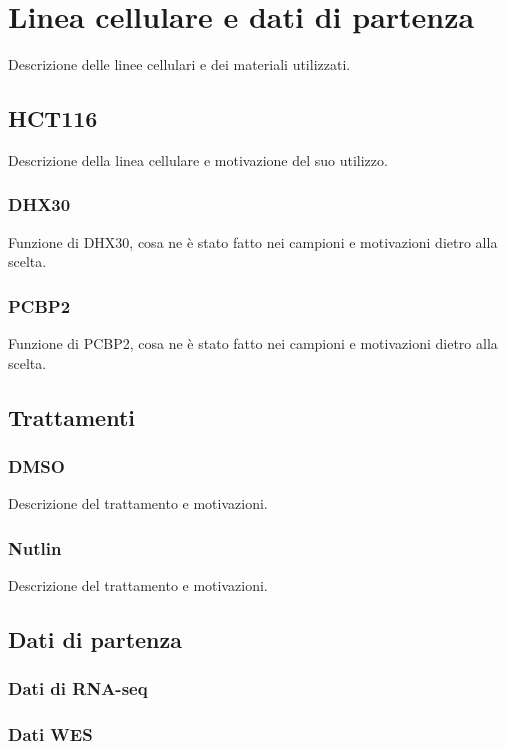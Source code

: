 \chapter{Linea cellulare e dati di partenza}
\label{cha:cell_lines}
Descrizione delle linee cellulari e dei materiali utilizzati.

\section{HCT116}
\label{sec:hct116}
Descrizione della linea cellulare e motivazione del suo utilizzo.

  \subsection{DHX30}
  \label{subsec:dhx30}
  Funzione di DHX30, cosa ne \`e stato fatto nei campioni e motivazioni dietro alla scelta.

  \subsection{PCBP2}
  \label{subsec:pcbp2}
  Funzione di PCBP2, cosa ne \`e stato fatto nei campioni e motivazioni dietro alla scelta.

\section{Trattamenti}
\label{sec:trattamenti}

  \subsection{DMSO}
  \label{subsec:dmso}
  Descrizione del trattamento e motivazioni.

  \subsection{Nutlin}
  \label{subsec:nutlin}
  Descrizione del trattamento e motivazioni.

\section{Dati di partenza}

  \subsection{Dati di RNA-seq}

  \subsection{Dati WES}
